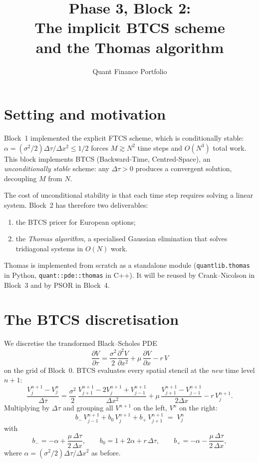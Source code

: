 \documentclass[11pt,a4paper]{article}
\title{Phase 3, Block 2:\\The implicit BTCS scheme\\and the Thomas algorithm}
\author{Quant Finance Portfolio}
\date{}
\begin{document}
\maketitle

\section{Setting and motivation}

Block~1 implemented the explicit FTCS scheme, which is conditionally
stable: $\alpha = (\sigma^2/2)\Delta\tau/\Delta x^2 \le 1/2$ forces
$M \gtrsim N^2$ time steps and $O(N^3)$ total work. This block
implements BTCS (Backward-Time, Centred-Space), an
\emph{unconditionally stable} scheme: any $\Delta\tau > 0$ produces a
convergent solution, decoupling $M$ from $N$.

The cost of unconditional stability is that each time step requires
solving a linear system. Block~2 has therefore two deliverables:
\begin{enumerate}[leftmargin=2em]
\item the BTCS pricer for European options;
\item the \emph{Thomas algorithm}, a specialised Gaussian elimination
that solves tridiagonal systems in $O(N)$ work.
\end{enumerate}
Thomas is implemented from scratch as a standalone module
(\texttt{quantlib.thomas} in Python, \texttt{quant::pde::thomas} in
C++). It will be reused by Crank--Nicolson in Block~3 and by PSOR in
Block~4.

\section{The BTCS discretisation}

We discretise the transformed Black--Scholes PDE
\begin{equation}
\frac{\partial V}{\partial \tau}
= \frac{\sigma^2}{2}\frac{\partial^2 V}{\partial x^2}
+ \mu\,\frac{\partial V}{\partial x}
- r\,V
\label{eq:transformed}
\end{equation}
on the grid of Block~0. BTCS evaluates every spatial stencil at the
\emph{new} time level $n+1$:
\[
\frac{V_j^{n+1} - V_j^n}{\Delta\tau}
= \frac{\sigma^2}{2}\,\frac{V_{j+1}^{n+1} - 2 V_j^{n+1} + V_{j-1}^{n+1}}{\Delta x^2}
+ \mu\,\frac{V_{j+1}^{n+1} - V_{j-1}^{n+1}}{2\Delta x}
- r\,V_j^{n+1}.
\]
Multiplying by $\Delta\tau$ and grouping all $V^{n+1}$ on the left,
$V^n$ on the right:
\begin{equation}
\boxed{\;
b_-\,V_{j-1}^{n+1} + b_0\,V_j^{n+1} + b_+\,V_{j+1}^{n+1}
\;=\; V_j^n
\;}
\label{eq:btcs}
\end{equation}
with
\[
b_- = -\alpha + \frac{\mu\,\Delta\tau}{2\,\Delta x},
\qquad
b_0 = 1 + 2\alpha + r\,\Delta\tau,
\qquad
b_+ = -\alpha - \frac{\mu\,\Delta\tau}{2\,\Delta x},
\]
where $\alpha = (\sigma^2/2)\Delta\tau/\Delta x^2$ as before.
\end{document}
